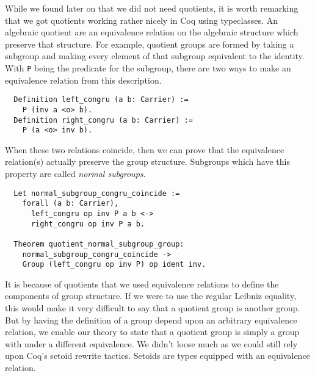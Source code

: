 \documentclass{article}
\begin{document}
While we found later on that we did not need quotients, it is worth remarking
that we got quotients working rather nicely in Coq using typeclasses. An
algebraic quotient are an equivalence relation on the algebraic structure which
preserve that structure. For example, quotient groups are formed by taking a
subgroup and making every element of that subgroup equivalent to the identity.
With \texttt{P} being the predicate for the subgroup, there are two ways to
make an equivalence relation from this description.
\begin{verbatim}
  Definition left_congru (a b: Carrier) :=
    P (inv a <o> b).
  Definition right_congru (a b: Carrier) :=
    P (a <o> inv b).
\end{verbatim}
When these two relations coincide, then we can prove that the equivalence
relation(s) actually preserve the group structure. Subgroups which have this
property are called \emph{normal subgroups}.
\begin{verbatim}
  Let normal_subgroup_congru_coincide :=
    forall (a b: Carrier),
      left_congru op inv P a b <->
      right_congru op inv P a b.

  Theorem quotient_normal_subgroup_group:
    normal_subgroup_congru_coincide ->
    Group (left_congru op inv P) op ident inv.
\end{verbatim}

It is because of quotients that we used equivalence relations to define the
components of group structure. If we were to use the regular Leibniz equality,
this would make it very difficult to say that a quotient group is another
group. But by having the definition of a group depend upon an arbitrary
equivalence relation, we enable our theory to state that a quotient group is
simply a group with under a different equivalence. We didn't loose much as we
could still rely upon Coq's setoid rewrite tactics. Setoids are types equipped
with an equivalence relation.
\end{document}
